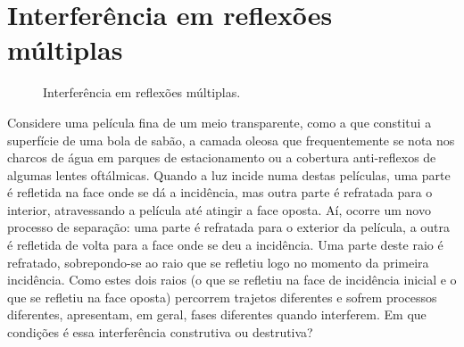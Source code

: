 %


\section{Interferência em reflexões múltiplas}
\begin{figure}
    {\centering
        
        \caption{Interferência em reflexões múltiplas.\label{fig:40-050}}

    }
\end{figure}
Considere uma película fina de um meio transparente, como a que constitui a
superfície de uma bola de sabão, a camada oleosa que frequentemente se nota nos
charcos de água em parques de estacionamento ou a cobertura anti-reflexos de
algumas lentes oftálmicas. Quando a luz incide numa destas películas, uma parte
é refletida na face onde se dá a incidência, mas outra parte é refratada para o
interior, atravessando a película até atingir a face oposta. Aí, ocorre um novo
processo de separação: uma parte é refratada para o exterior da película, a
outra é refletida de volta para a face onde se deu a incidência. Uma parte deste
raio é refratado, sobrepondo-se ao raio que se refletiu logo no momento da
primeira incidência. Como estes dois raios (o que se refletiu na face de
incidência inicial e o que se refletiu na face oposta) percorrem trajetos
diferentes e sofrem processos diferentes, apresentam, em geral, fases diferentes
quando interferem. Em que condições é essa interferência construtiva ou
destrutiva?

